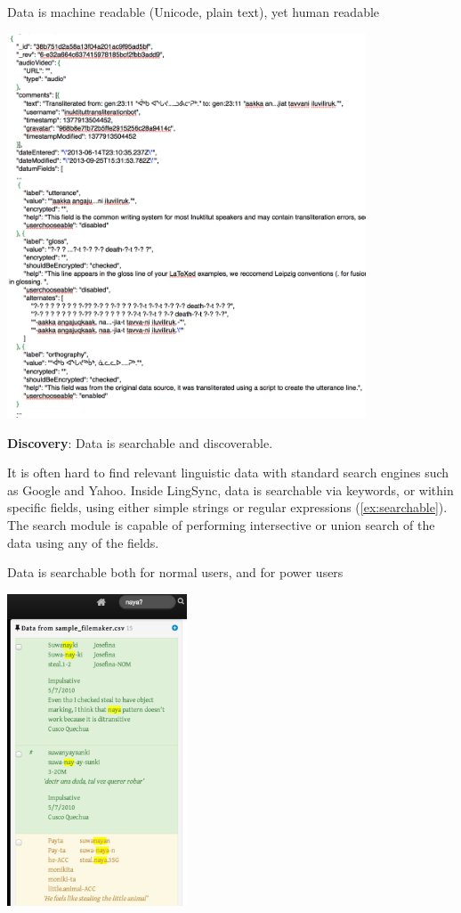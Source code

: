 \documentclass[letterpaper, 12pt, dvips]{mitwpl}
\begin{document}
\begin{description}
\begin{exe} 
\ex Data is machine readable (Unicode, plain text), yet human readable


 \centering
    \includegraphics[width=0.8\textwidth]{dataIsPlainTextUnicode}

\label{ex:intelligible}
\end{exe}


\item {\bf Discovery}: Data is searchable and discoverable. 
 
It is often hard to find relevant linguistic data with standard search engines such as Google and Yahoo.  
Inside LingSync, data is searchable via keywords, or within specific fields, using either simple strings or regular expressions (\ref{ex:searchable}). The search module is capable of performing intersective or union search of the data using any of the fields. 
\begin{exe} 
\ex Data is searchable both for normal users, and for power users

 \centering
    \includegraphics[width=0.4\textwidth]{searchable}


\end{exe}
\end{description}
\end{document}

